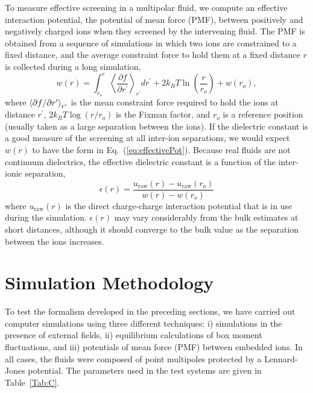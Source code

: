 To measure effective screening in a multipolar fluid, we compute an
effective interaction potential, the potential of mean force (PMF),
between positively and negatively charged ions when they screened by
the intervening fluid.  The PMF is obtained from a sequence of
simulations in which two ions are constrained to a fixed distance, and
the average constraint force to hold them at a fixed distance $r$ is
collected during a long simulation,\cite{Wilfred07}
\begin{equation}
w(r) = \int_{r_o}^{r}\left\langle \frac{\partial f}{\partial r^\prime}
\right\rangle_{r^\prime} dr^\prime + 2k_BT \ln\left(\frac{r}{r_o}\right) + w(r_o),
\label{eq:pmf}
\end{equation}
where $\braket{\partial f/\partial r^\prime}_{r^\prime}$ is the mean
constraint force required to hold the ions at distance $r^\prime$,
$2k_BT \log(r/r_o)$ is the Fixman factor,\cite{Fixman:1974fk} and
$r_o$ is a reference position (usually taken as a large separation
between the ions). If the dielectric constant is a good measure of the
screening at all inter-ion separations, we would expect $w(r)$ to have
the form in Eq.~(\ref{eq:effectivePot}).  Because real fluids are not
continuum dielectrics, the effective dielectric constant is a function
of the inter-ionic separation,
\begin{equation}
\epsilon(r) = \frac{u_\mathrm{raw}(r) - u_\mathrm{raw}(r_o) }{w(r) - w(r_o)} 
\end{equation}
where $u_\mathrm{raw}(r)$ is the direct charge-charge interaction
potential that is in use during the simulation.  $\epsilon(r)$ may
vary considerably from the bulk estimates at short distances, although
it should converge to the bulk value as the separation between the
ions increases.

\section{Simulation Methodology}

To test the formalism developed in the preceding sections, we have
carried out computer simulations using three different techniques: i)
simulations in the presence of external fields, ii) equilibrium
calculations of box moment fluctuations, and iii) potentials of mean
force (PMF) between embedded ions. In all cases, the fluids were
composed of point multipoles protected by a Lennard-Jones potential.
The parameters used in the test systems are given in Table~\ref{Tab:C}.

